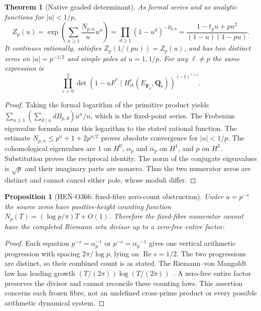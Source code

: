 \documentclass[10pt]{article}
\newtheorem{theorem}{Theorem}
\newtheorem{proposition}{Proposition}
\newcommand{\F}{\mathbf F}
\newcommand{\Q}{\mathbf Q}
\begin{document}
\begin{theorem}[Native graded determinant]
As formal series and as analytic functions for $|u|<1/p$,
\[
 Z_p(u)=\exp\left(\sum_{n\geq1}\frac{N_{p,n}}n u^n\right)
 =\prod_{d\geq1}(1-u^d)^{-B_{p,d}}
 =\frac{1-t_pu+pu^2}{(1-u)(1-pu)}.
\]
It continues rationally, satisfies $Z_p(1/(pu))=Z_p(u)$, and has two
distinct zeros on $|u|=p^{-1/2}$ and simple poles at $u=1,1/p$.
For any $\ell\ne p$ the same expression is
\[
 \prod_{r=0}^2\det(1-uF^*\mid H^r_{\mathrm{et}}
   (E_{\overline{\F}_p},\Q_\ell))^{(-1)^{r+1}}.
\]
\end{theorem}
\begin{proof}
Taking the formal logarithm of the primitive product yields
$\sum_{n\geq1}(\sum_{d\mid n}dB_{p,d})u^n/n$, which is the fixed-point
series. The Frobenius eigenvalue formula sums this logarithm to the
stated rational function. The estimate
$N_{p,n}\leq p^n+1+2p^{n/2}$ proves absolute convergence for $|u|<1/p$.
The cohomological eigenvalues are $1$ on $H^0$, $\alpha_p$ and
$\overline{\alpha_p}$ on $H^1$, and $p$ on $H^2$. Substitution proves
the reciprocal identity. The norm of the conjugate eigenvalues is
$\sqrt p$ and their imaginary parts are nonzero. Thus the two numerator
zeros are distinct and cannot cancel either pole, whose moduli differ.
\end{proof}

\begin{proposition}[HEN-O366: fixed-fibre zero-count obstruction]
Under $u=p^{-s}$ the source zeros have positive-height counting function
$N_p(T)=(\log p/\pi)T+O(1)$. Therefore the fixed-fibre numerator cannot
have the completed Riemann zeta divisor up to a zero-free entire factor.
\end{proposition}
\begin{proof}
Each equation $p^{-s}=\alpha_p^{-1}$ or
$p^{-s}=\overline{\alpha_p}^{-1}$ gives one vertical arithmetic
progression with spacing $2\pi/\log p$, lying on $\operatorname{Re}s=1/2$.
The two progressions are distinct, so their combined count is as stated.
The Riemann--von Mangoldt law has leading growth
$(T/(2\pi))\log(T/(2\pi))$~\cite{Brent}. A zero-free entire
factor preserves the divisor and cannot reconcile these counting laws.
This assertion concerns each frozen fibre, not an undefined cross-prime
product or every possible arithmetic dynamical system.
\end{proof}
\end{document}
